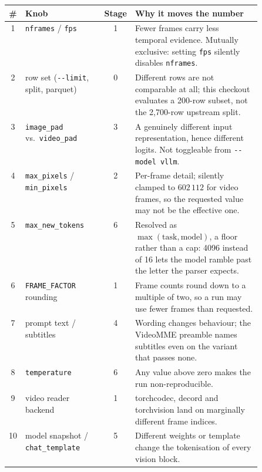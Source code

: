 \setlength{\tabcolsep}{4pt}
\renewcommand{\arraystretch}{1.12}
{\footnotesize
\begin{tabular}{@{}c l c p{0.505\linewidth}@{}}
\toprule
\# & Knob & Stage & Why it moves the number \\
\midrule
1  & \texttt{nframes} / \texttt{fps}                & 1 & Fewer frames carry less temporal evidence. Mutually exclusive: setting \texttt{fps} silently disables \texttt{nframes}. \\
2  & row set (\texttt{-{}-limit}, split, parquet)   & 0 & Different rows are not comparable at all; this checkout evaluates a 200-row subset, not the 2{,}700-row upstream split. \\
3  & \texttt{image\_pad} vs.\ \texttt{video\_pad}   & 3 & A genuinely different input representation, hence different logits. Not toggleable from \texttt{-{}-model vllm}. \\
4  & \texttt{max\_pixels} / \texttt{min\_pixels}    & 2 & Per-frame detail; silently clamped to $602\,112$ for video frames, so the requested value may not be the effective one. \\
5  & \texttt{max\_new\_tokens}                      & 6 & Resolved as $\max(\text{task},\text{model})$, a floor rather than a cap: 4096 instead of 16 lets the model ramble past the letter the parser expects. \\
6  & \texttt{FRAME\_FACTOR} rounding                & 1 & Frame counts round down to a multiple of two, so a run may use fewer frames than requested. \\
7  & prompt text / subtitles                        & 4 & Wording changes behaviour; the VideoMME preamble names subtitles even on the variant that passes none. \\
8  & \texttt{temperature}                           & 6 & Any value above zero makes the run non-reproducible. \\
9  & video reader backend                           & 1 & torchcodec, decord and torchvision land on marginally different frame indices. \\
10 & model snapshot / \texttt{chat\_template}       & 5 & Different weights or template change the tokenisation of every vision block. \\
\bottomrule
\end{tabular}}

